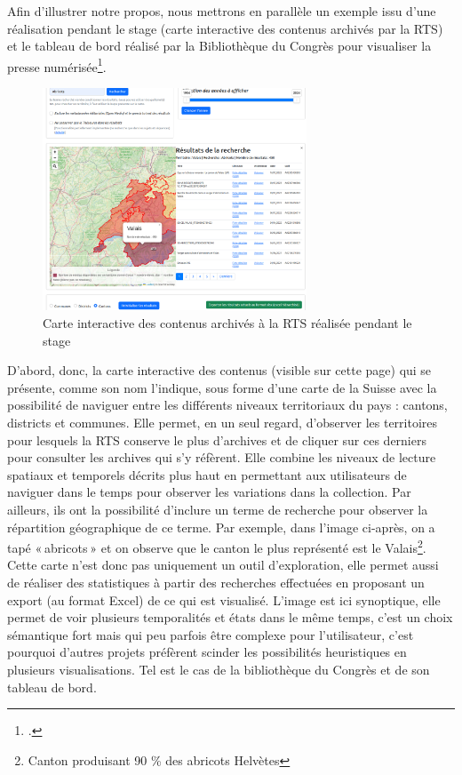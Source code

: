 Afin d’illustrer notre propos, nous mettrons en parallèle un exemple issu d’une réalisation pendant le stage (carte interactive des contenus archivés par la RTS) et le tableau de bord réalisé par la Bibliothèque du Congrès pour visualiser la presse numérisée\footcite[tableau de bord accessible en suivant l'url suivante \url{https://public.tableau.com/app/profile/chronicling.america/viz/ChroniclingAmericaTemporalCoveragebyStateMap/TemporalStateCoverage}]{noauthor_chronicling_nodate}.

\begin{figure}[h!]
	\centering
	\includegraphics[width=0.7\textwidth]{images/image14.png}
	\caption{Carte interactive des contenus archivés à la RTS réalisée pendant le stage}
	\label{fig:image14}
\end{figure}

\newpage

D’abord, donc, la carte interactive des contenus (visible sur cette page) qui se présente, comme son nom l’indique, sous forme d’une carte de la Suisse avec la possibilité de naviguer entre les différents niveaux territoriaux du pays : cantons, districts et communes. Elle permet, en un seul regard, d’observer les territoires pour lesquels la RTS conserve le plus d’archives et de cliquer sur ces derniers pour consulter les archives qui s’y réfèrent. Elle combine les niveaux de lecture spatiaux et temporels décrits plus haut en permettant aux utilisateurs de naviguer dans le temps pour observer les variations dans la collection. Par ailleurs, ils ont la possibilité d’inclure un terme de recherche pour observer la répartition géographique de ce terme. Par exemple, dans l’image ci-après, on a tapé « abricots » et on observe que le canton le plus représenté est le Valais\footnote{Canton produisant 90 \% des abricots Helvètes}. Cette carte n’est donc pas uniquement un outil d’exploration, elle permet aussi de réaliser des statistiques à partir des recherches effectuées en proposant un export (au format Excel) de ce qui est visualisé. L'image est ici synoptique, elle permet de voir plusieurs temporalités et états dans le même temps, c'est un choix sémantique fort mais qui peu parfois être complexe pour l'utilisateur, c'est pourquoi d'autres projets préfèrent scinder les possibilités heuristiques en plusieurs visualisations. Tel est le cas de la bibliothèque du Congrès et de son tableau de bord.
\newpage

